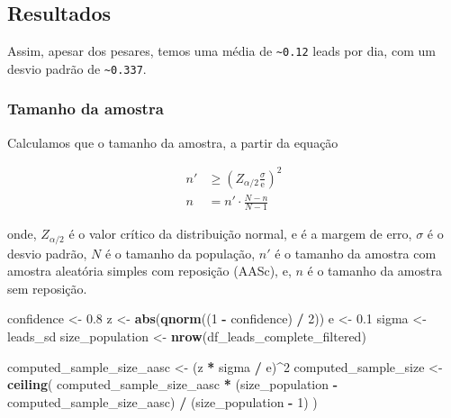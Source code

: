 \documentclass[
]{article}
\newenvironment{Shaded}{\begin{snugshade}}{\end{snugshade}}
\newcommand{\DecValTok}[1]{\textcolor[rgb]{0.00,0.00,0.81}{#1}}
\newcommand{\FloatTok}[1]{\textcolor[rgb]{0.00,0.00,0.81}{#1}}
\newcommand{\FunctionTok}[1]{\textcolor[rgb]{0.13,0.29,0.53}{\textbf{#1}}}
\newcommand{\NormalTok}[1]{#1}
\newcommand{\OtherTok}[1]{\textcolor[rgb]{0.56,0.35,0.01}{#1}}
\newcommand{\SpecialCharTok}[1]{\textcolor[rgb]{0.81,0.36,0.00}{\textbf{#1}}}
\begin{document}
\subsection{Resultados}\label{resultados}

Assim, apesar dos pesares, temos uma média de
\texttt{\textasciitilde{}0.12} leads por dia, com um desvio padrão de
\texttt{\textasciitilde{}0.337}.

\subsubsection{Tamanho da amostra}\label{tamanho-da-amostra}

Calculamos que o tamanho da amostra, a partir da equação

\[
\begin{aligned}
n' &\ge \left(Z_{\alpha / 2} \frac{\sigma}{\text{e}}\right)^2 \\
n  &= n' \cdot \frac{N-n}{N-1}
\end{aligned}
\]

onde, \(Z_{\alpha / 2}\) é o valor crítico da distribuição normal,
\(\text{e}\) é a margem de erro, \(\sigma\) é o desvio padrão, \(N\) é o
tamanho da população, \(n'\) é o tamanho da amostra com amostra
aleatória simples com reposição (AASc), e, \(n\) é o tamanho da amostra
sem reposição.

\begin{Shaded}
\begin{Highlighting}[]
\NormalTok{confidence }\OtherTok{\textless{}{-}} \FloatTok{0.8}
\NormalTok{z }\OtherTok{\textless{}{-}} \FunctionTok{abs}\NormalTok{(}\FunctionTok{qnorm}\NormalTok{((}\DecValTok{1} \SpecialCharTok{{-}}\NormalTok{ confidence) }\SpecialCharTok{/} \DecValTok{2}\NormalTok{))}
\NormalTok{e }\OtherTok{\textless{}{-}} \FloatTok{0.1}
\NormalTok{sigma }\OtherTok{\textless{}{-}}\NormalTok{ leads\_sd}
\NormalTok{size\_population }\OtherTok{\textless{}{-}} \FunctionTok{nrow}\NormalTok{(df\_leads\_complete\_filtered)}

\NormalTok{computed\_sample\_size\_aasc }\OtherTok{\textless{}{-}}\NormalTok{ (z }\SpecialCharTok{*}\NormalTok{ sigma }\SpecialCharTok{/}\NormalTok{ e)}\SpecialCharTok{\^{}}\DecValTok{2}
\NormalTok{computed\_sample\_size }\OtherTok{\textless{}{-}} \FunctionTok{ceiling}\NormalTok{(}
\NormalTok{  computed\_sample\_size\_aasc }\SpecialCharTok{*}
\NormalTok{    (size\_population }\SpecialCharTok{{-}}\NormalTok{ computed\_sample\_size\_aasc) }\SpecialCharTok{/}\NormalTok{ (size\_population }\SpecialCharTok{{-}} \DecValTok{1}\NormalTok{)}
\NormalTok{)}
\end{Highlighting}
\end{Shaded}
\end{document}
